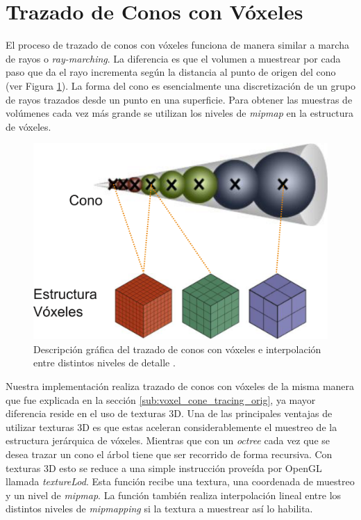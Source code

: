 \section{Trazado de Conos con Vóxeles} %

\label{sec:trazado_de_conos_con_voxeles}

El proceso de trazado de conos con vóxeles funciona de manera similar a marcha de rayos o \emph{ray-marching}. La diferencia es que el volumen a muestrear por cada paso que da el rayo incrementa según la distancia al punto de origen del cono (ver Figura \ref{fig:vct_explain}). La forma del cono es esencialmente una discretización de un grupo de rayos trazados desde un punto en una superficie. Para obtener las muestras de volúmenes cada vez más grande se utilizan los niveles de \emph{mipmap} en la estructura de vóxeles.

\begin{figure}
	\includegraphics[width=0.95\linewidth]{media/vct_explain.png}
	\caption{Descripción gráfica del trazado de conos con vóxeles e interpolación entre distintos niveles de detalle \cite{Oliver:2012:UEE:2341836.2341909}.}
	\label{fig:vct_explain}
\end{figure}

\noindent Nuestra implementación realiza trazado de conos con vóxeles de la misma manera que fue explicada en la sección \ref{sub:voxel_cone_tracing_orig}, ya mayor diferencia reside en el uso de texturas 3D. Una de las principales ventajas de utilizar texturas 3D es que estas aceleran considerablemente el muestreo de la estructura jerárquica de vóxeles. Mientras que con un \emph{octree} cada vez que se desea trazar un cono el árbol tiene que ser recorrido de forma recursiva. Con texturas 3D esto se reduce a una simple instrucción proveída por OpenGL llamada \emph{textureLod}. Esta función recibe una textura, una coordenada de muestreo y un nivel de \emph{mipmap}. La función también realiza interpolación lineal entre los distintos niveles de \emph{mipmapping} si la textura a muestrear así lo habilita.
